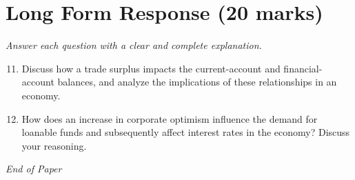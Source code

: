 \documentclass[12pt]{article}
\begin{document}
\section*{Long Form Response (20 marks)}
\textit{Answer each question with a clear and complete explanation.}
\begin{enumerate}[label=\arabic*.]
\setcounter{enumi}{10}
\item Discuss how a trade surplus impacts the current-account and financial-account balances, and analyze the implications of these relationships in an economy.
\item How does an increase in corporate optimism influence the demand for loanable funds and subsequently affect interest rates in the economy? Discuss your reasoning.
\end{enumerate}

\vfill
\noindent\textit{End of Paper}
\end{document}
